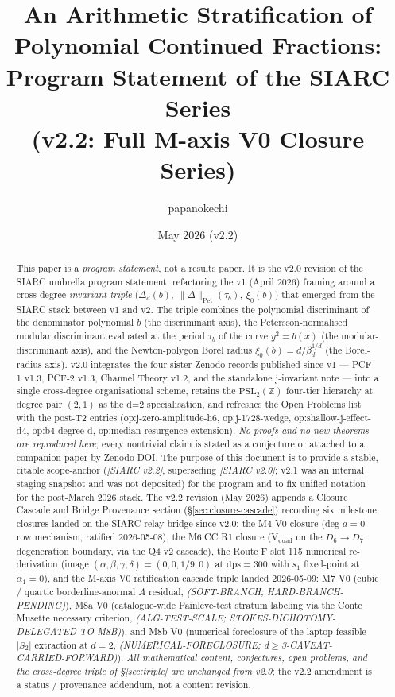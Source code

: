 \documentclass[11pt,a4paper]{article}
\title{An Arithmetic Stratification of Polynomial Continued Fractions:\\
       Program Statement of the SIARC Series\\
       \large (v2.2: Full M-axis V0 Closure Series)}
\author{papanokechi}
\date{May 2026 (v2.2)}
\theoremstyle{definition}
\theoremstyle{remark}
\newcommand{\PSLZ}{\mathrm{PSL}_2(\mathbb{Z})}
\newcommand{\PetN}[1]{\lVert #1 \rVert_{\mathrm{Pet}}}
\begin{document}
\maketitle

\begin{abstract}
This paper is a \emph{program statement}, not a results paper. It is the
v2.0 revision of the SIARC umbrella program statement, refactoring the
v1 (April 2026) framing around a cross-degree \emph{invariant triple}
\(\bigl(\Delta_d(b),\ \PetN{\Delta}(\tau_b),\ \xi_0(b)\bigr)\) that
emerged from the SIARC stack between v1 and v2. The triple combines
the polynomial discriminant of the denominator polynomial \(b\) (the
discriminant axis), the Petersson-normalised modular discriminant
evaluated at the period \(\tau_b\) of the curve \(y^2 = b(x)\) (the
modular-discriminant axis), and the Newton-polygon Borel radius
\(\xi_0(b) = d/\beta_d^{1/d}\) (the Borel-radius axis). v2.0 integrates
the four sister Zenodo records published since v1 --- PCF-1 v1.3,
PCF-2 v1.3, Channel Theory v1.2, and the standalone j-invariant
note --- into a single cross-degree organisational scheme, retains the
$\PSLZ$ four-tier hierarchy at degree pair \((2,1)\) as the d=2
specialisation, and refreshes the Open Problems list with the
post-T2 entries (\textsf{op:j-zero-amplitude-h6},
\textsf{op:j-1728-wedge}, \textsf{op:shallow-j-effect-d4},
\textsf{op:b4-degree-d}, \textsf{op:median-resurgence-extension}).
\emph{No proofs and no new theorems are reproduced here}; every
nontrivial claim is stated as a conjecture or attached to a companion
paper by Zenodo DOI. The purpose of this document is to provide a
stable, citable scope-anchor (\emph{[SIARC v2.2]}, superseding
\emph{[SIARC v2.0]}; v2.1 was an internal staging snapshot and was
not deposited) for the program and to fix unified notation for
the post-March 2026 stack. The v2.2 revision (May 2026) appends a
Closure Cascade and Bridge Provenance section
(\S\ref{sec:closure-cascade}) recording six milestone closures landed
on the SIARC relay bridge since v2.0: the M4 V0 closure (deg-$a=0$ row
mechanism, ratified 2026-05-08), the M6.CC R1 closure (V$_{\mathrm{quad}}$
on the $D_6 \to D_7$ degeneration boundary, via the Q4 v2 cascade),
the Route F slot 115 numerical re-derivation (image
$(\alpha,\beta,\gamma,\delta) = (0,0,1/9,0)$ at $\mathrm{dps}=300$ with
$s_1$ fixed-point at $\alpha_1 = 0$), and the M-axis V0 ratification
cascade triple landed 2026-05-09: M7 V0 (cubic / quartic borderline-anormal $A$ residual,
\emph{(SOFT-BRANCH; HARD-BRANCH-PENDING)}), M8a V0 (catalogue-wide
Painlev\'e-test stratum labeling via the Conte--Musette necessary
criterion, \emph{(ALG-TEST-SCALE; STOKES-DICHOTOMY-DELEGATED-TO-M8B)}),
and M8b V0 (numerical foreclosure of the laptop-feasible $|S_2|$
extraction at $d=2$, \emph{(NUMERICAL-FORECLOSURE; d$\geq$3-CAVEAT-CARRIED-FORWARD)}).
\emph{All mathematical content, conjectures, open problems, and the
cross-degree triple of \S\ref{sec:triple} are unchanged from v2.0};
the v2.2 amendment is a status / provenance addendum, not a content
revision.
\end{abstract}
\end{document}
